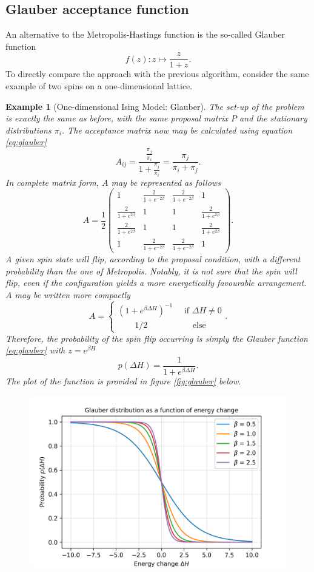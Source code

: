 \documentclass[]{article}
\numberwithin{equation}{section}
\theoremstyle{break}
\newtheorem*{example}{Example}
\begin{document}
\subsection{Glauber acceptance function}
An alternative to the Metropolis-Hastings function is the so-called Glauber function
\begin{equation}
f(z): z \mapsto \frac{z}{1+z}.
\label{eq:glauber}
\end{equation}
To directly compare the approach with the previous algorithm, consider the same example of two spins on a one-dimensional lattice.
\begin{example}[One-dimensional Ising Model: Glauber]
The set-up of the problem is exactly the same as before, with the same proposal matrix $P$ and the stationary distributions $\pi_i$. The acceptance matrix now may be calculated using equation \eqref{eq:glauber}
\[A_{ij} = \frac{\frac{\pi_j}{\pi_i}}{1 + \frac{\pi_j}{\pi_i}} = \frac{\pi_j}{\pi_i + \pi_j}.\]
In complete matrix form, $A$ may be represented as follows
\[A = \frac{1}{2}\begin{pmatrix}
    1 & \frac{2}{1+e^{-2\beta}} & \frac{2}{1+e^{-2\beta}} & 1 \\
    \frac{2}{1+e^{2\beta}} & 1 & 1 & \frac{2}{1+e^{2\beta}} \\
    \frac{2}{1+e^{2\beta}} & 1 & 1 & \frac{2}{1+e^{2\beta}} \\
    1 & \frac{2}{1+e^{-2\beta}} & \frac{2}{1+e^{-2\beta}} & 1
\end{pmatrix}.\]
A given spin state will flip, according to the proposal condition, with a different probability than the one of Metropolis. Notably, it is not sure that the spin will flip, even if the configuration yields a more energetically favourable arrangement. $A$ may be written more compactly
\[A = \begin{cases}
    (1+e^{\beta\Delta H})^{-1} \quad \text{ if } \Delta H \neq 0 \\
   \quad \quad 1/2\quad\quad\quad\quad\quad \text{ else}
\end{cases}.\]
Therefore, the probability of the spin flip occurring is simply the Glauber function \eqref{eq:glauber} with $z = e^{\beta H}$
\[p(\Delta H) = \frac{1}{1+e^{\beta \Delta H}}.\]
The plot of the function is provided in figure \ref{fig:glauber} below.
\begin{figure}[H]
    \centering
    \includegraphics[scale=0.7]{figures/glauber.png}

\end{figure}
\end{example}
\end{document}
